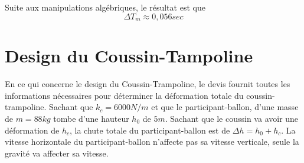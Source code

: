 \documentclass[12pt]{article}
\begin{document}
Suite aux manipulations algébriques, le résultat est que 
\begin{equation}
\Delta T_m \approx 0,056 sec
\end{equation}

\section{Design du Coussin-Tampoline}
En ce qui concerne le design du Coussin-Trampoline, le devis fournit toutes les informations nécessaires pour déterminer la déformation totale du coussin-trampoline. Sachant que $k_c = 6000N/m$ et que le participant-ballon, d'une masse de $m = 88kg$ tombe d'une hauteur $h_0$ de $5 m$. Sachant que le coussin va avoir une déformation de $h_c$, la chute totale du participant-ballon est de $\Delta h = h_0 + h_c$. La vitesse horizontale du participant-ballon n'affecte pas sa vitesse verticale, seule la gravité va affecter sa vitesse.
\end{document}
